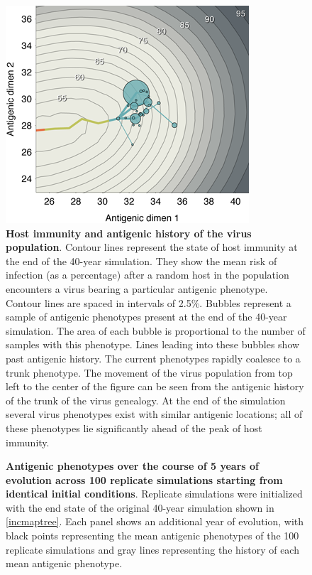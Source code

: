 \begin{figure}[H]
	\centering
	\includegraphics{figures/immunity}
	\caption{\textbf{Host immunity and antigenic history of the virus population}.  Contour lines represent the state of host immunity at the end of the 40-year simulation.  They show the mean risk of infection (as a percentage) after a random host in the population encounters a virus bearing a particular antigenic phenotype.  Contour lines are spaced in intervals of 2.5\%. Bubbles represent a sample of antigenic phenotypes present at the end of the 40-year simulation.  The area of each bubble is proportional to the number of samples with this phenotype.  Lines leading into these bubbles show past antigenic history.  The current phenotypes rapidly coalesce to a trunk phenotype.  The movement of the virus population from top left to the center of the figure can be seen from the antigenic history of the trunk of the virus genealogy. At the end of the simulation several virus phenotypes exist with similar antigenic locations; all of these phenotypes lie significantly ahead of the peak of host immunity.}
	\label{immunity}
\end{figure}

\begin{figure}[H]
	\centering
	\caption{\textbf{Antigenic phenotypes over the course of 5 years of evolution across 100 replicate simulations starting from identical initial conditions}.  Replicate simulations were initialized with the end state of the original 40-year simulation shown in \ref{incmaptree}.  Each panel shows an additional year of evolution, with black points representing the mean antigenic phenotypes of the 100 replicate simulations and gray lines representing the history of each mean antigenic phenotype.}
	\label{replicateevol}
\end{figure}

